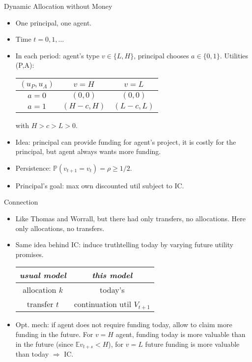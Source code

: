 \documentclass[english,10pt
,aspectratio=169
]{beamer}
\begin{document}
\begin{frame}{Dynamic Allocation without Money \citep{guo_dynamic_2018}}
\begin{itemize}
	\item One principal, one agent.
	\item Time $t=0,1,...$
	\item In each period: agent's type $v \in \{L,H\}$, principal chooses $a \in \{0,1\}$. Utilities (P,A):
	\medskip
	\begin{center}
		\begin{tabular}{c | c | c |}
			$(u_P,u_A)$ & $v = H$ 	& $v=L$ \\ \hline
			$a=0$	& $(0,0)$ 	& $(0,0)$	\\ \hline
			$a=1$	& $(H-c,H)$ 	& $(L-c,L)$	\\ \hline
		\end{tabular}
	\end{center}
	\medskip
	with $H > c > L > 0$.
	\item Idea: principal can provide funding for agent's project, it is costly for the principal, but agent always wants more funding.
	\item Persistence: $\mathbb{P}(v_{t+1} = v_t) = \rho \geq 1/2$.
	\item Principal's goal: max own discounted util subject to IC.
\end{itemize}
\end{frame}


\begin{frame}{Connection}
\begin{itemize}
	\item Like Thomas and Worrall, but there had only transfers, no allocations. Here only allocations, no transfers.
	\item Same idea behind IC: induce truthtelling today by varying future utility promises.
	\medskip
	\begin{center}
		\begin{tabular}{| c | c |}
			\hline
			\emph{usual model} 	& \emph{this model} \\ \hline
			allocation $k$ 	& today's \structure{allocation $a_t$}\\ \hline
			transfer $t$ 	& continuation util $V_{t+1}$\\ \hline
		\end{tabular}
	\end{center}
	\medskip
	\item Opt. mech: if agent does not require funding today, allow to claim more funding in the future. For $v=H$ agent, funding today is more valuable than in the future (since $\mathbb{E} v_{t+s} < H$), for $v=L$ future funding is more valuable than today $\Rightarrow$ IC.
\end{itemize}
\end{frame}
\end{document}
